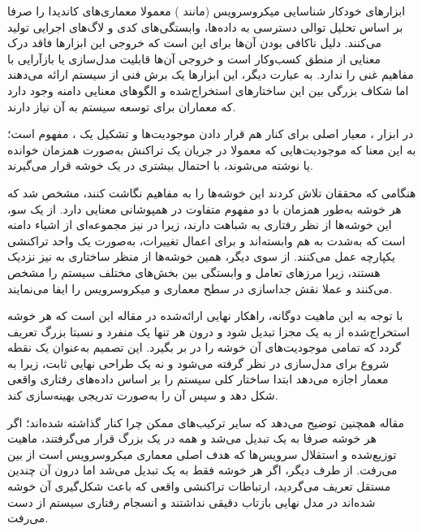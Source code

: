 ابزارهای خودکار شناسایی میکروسرویس (مانند ) معمولا معماری‌های کاندیدا را صرفا بر اساس تحلیل توالی دسترسی به داده‌ها، وابستگی‌های کدی و لاگ‌های اجرایی تولید می‌کنند. دلیل ناکافی بودن آن‌ها برای  این است که خروجی این ابزارها فاقد درک معنایی از منطق کسب‌وکار است و خروجی آن‌ها قابلیت مدل‌سازی یا بازآرایی با مفاهیم غنی  را ندارد. به عبارت دیگر، این ابزارها یک برش فنی از سیستم ارائه می‌دهند اما شکاف بزرگی بین این ساختارهای استخراج‌شده و الگوهای معنایی دامنه وجود دارد که معماران برای توسعه سیستم به آن نیاز دارند.

\vspace{0.5em}


در ابزار ، معیار اصلی برای کنار هم قرار دادن موجودیت‌ها و تشکیل یک ، مفهوم  است؛ به این معنا که موجودیت‌هایی که معمولا در جریان یک تراکنش به‌صورت همزمان خوانده یا نوشته می‌شوند، با احتمال بیشتری در یک خوشه قرار می‌گیرند.

هنگامی که محققان تلاش کردند این خوشه‌ها را به مفاهیم  نگاشت کنند، مشخص شد که هر خوشه به‌طور همزمان با دو مفهوم متفاوت در  همپوشانی معنایی دارد. از یک سو، این خوشه‌ها از نظر رفتاری به  شباهت دارند، زیرا در  نیز  مجموعه‌ای از اشیاء دامنه است که به‌شدت به هم وابسته‌اند و برای اعمال تغییرات، به‌صورت یک واحد تراکنشی یکپارچه عمل می‌کنند. از سوی دیگر، همین خوشه‌ها از منظر ساختاری به  نیز نزدیک هستند، زیرا مرزهای تعامل و وابستگی بین بخش‌های مختلف سیستم را مشخص می‌کنند و عملا نقش جداسازی در سطح معماری و میکروسرویس را ایفا می‌نمایند.

با توجه به این ماهیت دوگانه، راهکار نهایی ارائه‌شده در مقاله این است که هر خوشه استخراج‌شده از  به یک  مجزا تبدیل شود و درون هر  تنها یک  منفرد و نسبتا بزرگ تعریف گردد که تمامی موجودیت‌های آن خوشه را در بر بگیرد. این تصمیم به‌عنوان یک نقطه شروع برای مدل‌سازی در نظر گرفته می‌شود و نه یک طراحی نهایی ثابت، زیرا به معمار اجازه می‌دهد ابتدا ساختار کلی سیستم را بر اساس داده‌های رفتاری واقعی شکل دهد و سپس آن را به‌صورت تدریجی بهینه‌سازی کند.

مقاله همچنین توضیح می‌دهد که سایر ترکیب‌های ممکن چرا کنار گذاشته شده‌اند؛ اگر هر خوشه صرفا به یک  تبدیل می‌شد و همه در یک  بزرگ قرار می‌گرفتند، ماهیت توزیع‌شده و استقلال سرویس‌ها که هدف اصلی معماری میکروسرویس است از بین می‌رفت. از طرف دیگر، اگر هر خوشه فقط به یک  تبدیل می‌شد اما درون آن چندین  مستقل تعریف می‌گردید، ارتباطات تراکنشی واقعی که باعث شکل‌گیری آن خوشه شده‌اند در مدل نهایی بازتاب دقیقی نداشتند و انسجام رفتاری سیستم از دست می‌رفت.

